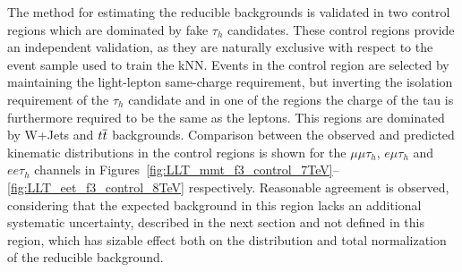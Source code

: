 The method for estimating the reducible backgrounds is validated in two control regions which are dominated by fake $\tau_h$ candidates.
These control regions provide an independent validation, as they are naturally exclusive with respect to the event sample used to train the kNN. Events in the control region are selected by maintaining
the light-lepton same-charge requirement, but inverting the isolation requirement of the $\tau_h$ candidate and in one of the regions the charge of the tau is furthermore required to be the same as the leptons.
This regions are dominated by W+Jets and $t\overline{t}$ backgrounds.
Comparison between the observed and predicted kinematic distributions in the control regions is shown for the $\mu\mu\tau_h$, $e\mu\tau_h$ and $ee\tau_h$ channels in Figures~\ref{fig:LLT_mmt_f3_control_7TeV}--\ref{fig:LLT_eet_f3_control_8TeV} respectively.
Reasonable agreement is observed, considering that the expected background in this region lacks an additional systematic uncertainty, described in the next section and not defined in this region, which has sizable effect both on the distribution and total normalization of the reducible background.

